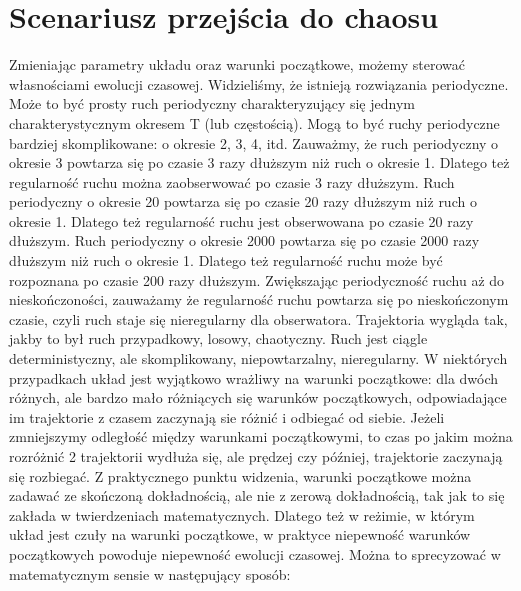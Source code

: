 \documentclass[a4paper,12pt,polish]{sphinxmanual}
\begin{document}
\section{Scenariusz przejścia do chaosu}
\label{ch2/chII012::doc}\label{ch2/chII012:scenariusz-przejscia-do-chaosu}
Zmieniając parametry układu oraz warunki początkowe, możemy sterować własnościami ewolucji czasowej. Widzieliśmy, że istnieją rozwiązania periodyczne. Może to być prosty ruch periodyczny charakteryzujący się jednym charakterystycznym okresem T (lub częstością).  Mogą to być ruchy periodyczne bardziej skomplikowane:  o okresie 2, 3, 4, itd. Zauważmy, że ruch periodyczny o okresie 3 powtarza się po czasie 3 razy dłuższym niż ruch o okresie 1. Dlatego też regularność ruchu można zaobserwować po czasie  3 razy dłuższym.   Ruch periodyczny o okresie 20 powtarza się po czasie 20 razy dłuższym niż ruch o okresie 1. Dlatego też regularność ruchu jest obserwowana po czasie 20 razy dłuższym.  Ruch periodyczny o okresie 2000 powtarza się po czasie 2000 razy dłuższym niż ruch o okresie 1. Dlatego też regularność ruchu może być rozpoznana po czasie  200 razy dłuższym.  Zwiększając periodyczność ruchu aż do nieskończoności, zauważamy że regularność ruchu powtarza się po nieskończonym czasie, czyli ruch staje się nieregularny dla obserwatora. Trajektoria wygląda tak, jakby to był ruch przypadkowy, losowy, chaotyczny. Ruch jest ciągle deterministyczny, ale skomplikowany,  niepowtarzalny, nieregularny. W niektórych przypadkach układ jest wyjątkowo wrażliwy na warunki początkowe: dla dwóch różnych, ale bardzo mało różniących się warunków początkowych, odpowiadające im trajektorie z czasem zaczynają sie różnić i odbiegać od siebie. Jeżeli zmniejszymy odległość między warunkami początkowymi, to czas po jakim można rozróżnić  2 trajektorii wydłuża się, ale prędzej czy później, trajektorie zaczynają się rozbiegać. Z praktycznego punktu widzenia, warunki początkowe można zadawać ze skończoną dokładnością, ale nie z zerową dokładnością, tak jak to się zakłada w twierdzeniach matematycznych. Dlatego też w reżimie, w którym układ jest czuły na warunki początkowe, w praktyce niepewność warunków początkowych powoduje niepewność  ewolucji czasowej. Można to sprecyzować w matematycznym sensie w następujący sposób:
\end{document}
